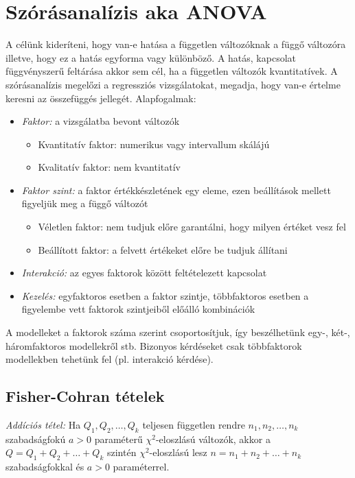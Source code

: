 \chapter{Szórásanalízis aka ANOVA}

A célünk kideríteni, hogy van-e hatása a független változóknak a függő változóra illetve, hogy ez a hatás egyforma vagy különböző. A hatás, kapcsolat függvényszerű feltárása akkor sem cél, ha a független változók kvantitatívek. A szórásanalízis megelőzi a regressziós vizsgálatokat, megadja, hogy van-e értelme keresni az összefüggés jellegét. Alapfogalmak:
\begin{itemize}
\item \emph{Faktor:} a vizsgálatba bevont változók
\begin{itemize}
\item Kvantitatív faktor: numerikus vagy intervallum skálájú
\item Kvalitatív faktor: nem kvantitatív
\end{itemize}
\item \emph{Faktor szint:} a faktor értékkészletének egy eleme, ezen beállítások mellett figyeljük meg a függő változót
\begin{itemize}
\item Véletlen faktor: nem tudjuk előre garantálni, hogy milyen értéket vesz fel
\item Beállított faktor: a felvett értékeket előre be tudjuk állítani
\end{itemize}
\item \emph{Interakció:} az egyes faktorok között feltételezett kapcsolat
\item \emph{Kezelés:} egyfaktoros esetben a faktor szintje, többfaktoros esetben a figyelembe vett faktorok szintjeiből előálló kombinációk
\end{itemize}

A modelleket a faktorok száma szerint csoportosítjuk, így beszélhetünk egy-, két-, háromfaktoros modellekről stb. Bizonyos kérdéseket csak többfaktorok modellekben tehetünk fel (pl. interakció kérdése).

\section{Fisher-Cohran tételek}

\emph{Addíciós tétel:} Ha $Q_1, Q_2, …, Q_k$ teljesen független rendre $n_1, n_2, …, n_k$ szabadságfokú $a>0$ paraméterű $\chi^2$-eloszlású változók, akkor a $Q= Q_1+ Q_2+ …+ Q_k$ szintén $\chi^2$-eloszlású lesz $n= n_1+ n_2+ …+n_k$ szabadságfokkal és $a>0$ paraméterrel.

